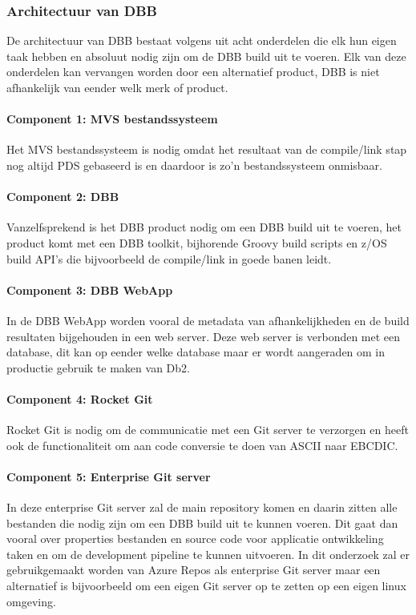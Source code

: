 \subsubsection{Architectuur van DBB}
De architectuur van DBB bestaat volgens \textcite{IBM2021a} uit acht onderdelen die elk hun eigen taak hebben en absoluut nodig zijn om de DBB build uit te voeren. Elk van deze onderdelen kan vervangen worden door een alternatief product, DBB is niet afhankelijk van eender welk merk of product.
\paragraph{Component 1: MVS bestandssysteem}
Het MVS bestandssysteem is nodig omdat het resultaat van de compile/link stap nog altijd PDS gebaseerd is en daardoor is zo'n bestandssysteem onmisbaar.
\paragraph{Component 2: DBB}
Vanzelfsprekend is het DBB product nodig om een DBB build uit te voeren, het product komt met een DBB toolkit, bijhorende Groovy build scripts en z/OS build API's die bijvoorbeeld de compile/link in goede banen leidt.
\paragraph{Component 3: DBB WebApp}
In de DBB WebApp worden vooral de metadata van afhankelijkheden en de build resultaten bijgehouden in een web server. Deze web server is verbonden met een database, dit kan op eender welke database maar er wordt aangeraden om in productie gebruik te maken van Db2.
\paragraph{Component 4: Rocket Git}
Rocket Git is nodig om de communicatie met een Git server te verzorgen en heeft ook de functionaliteit om aan code conversie te doen van ASCII naar EBCDIC.
\paragraph{Component 5: Enterprise Git server}
In deze enterprise Git server zal de main repository komen en daarin zitten alle bestanden die nodig zijn om een DBB build uit te kunnen voeren. Dit gaat dan vooral over properties bestanden en source code voor applicatie ontwikkeling taken en om de development pipeline te kunnen uitvoeren. In dit onderzoek zal er gebruikgemaakt worden van Azure Repos als enterprise Git server maar een alternatief is bijvoorbeeld om een eigen Git server op te zetten op een eigen linux omgeving.
